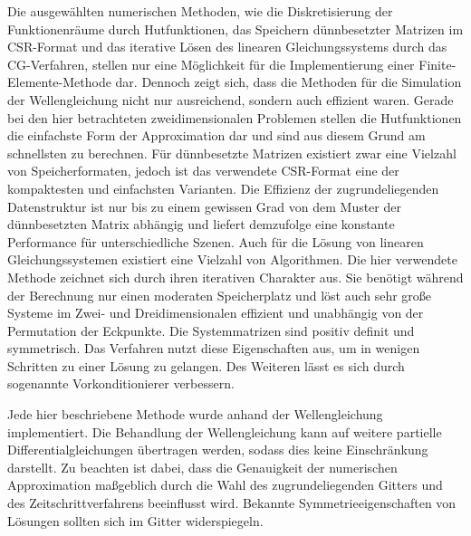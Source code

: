\documentclass{article}
\begin{document}
    Die ausgewählten numerischen Methoden, wie die Diskretisierung der Funktionenräume durch Hutfunktionen, das Speichern dünnbesetzter Matrizen im CSR-Format und das iterative Lösen des linearen Gleichungssystems durch das CG-Verfahren, stellen nur eine Möglichkeit für die Implementierung einer Finite-Elemente-Methode dar.
    Dennoch zeigt sich, dass die Methoden für die Simulation der Wellengleichung nicht nur ausreichend, sondern auch effizient waren.
    Gerade bei den hier betrachteten zweidimensionalen Problemen stellen die Hutfunktionen die einfachste Form der Approximation dar und sind aus diesem Grund am schnellsten zu berechnen.
    Für dünnbesetzte Matrizen existiert zwar eine Vielzahl von Speicherformaten, jedoch ist das verwendete CSR-Format eine der kompaktesten und einfachsten Varianten.
    Die Effizienz der zugrundeliegenden Datenstruktur ist nur bis zu einem gewissen Grad von dem Muster der dünnbesetzten Matrix abhängig und liefert demzufolge eine konstante Performance für unterschiedliche Szenen.
    Auch für die Lösung von linearen Gleichungssystemen existiert eine Vielzahl von Algorithmen.
    Die hier verwendete Methode zeichnet sich durch ihren iterativen Charakter aus.
    Sie benötigt während der Berechnung nur einen moderaten Speicherplatz und löst auch sehr große Systeme im Zwei- und Dreidimensionalen effizient und unabhängig von der Permutation der Eckpunkte.
    Die Systemmatrizen sind positiv definit und symmetrisch.
    Das Verfahren nutzt diese Eigenschaften aus, um in wenigen Schritten zu einer Lösung zu gelangen.
    Des Weiteren lässt es sich durch sogenannte Vorkonditionierer verbessern.

    Jede hier beschriebene Methode wurde anhand der Wellengleichung implementiert.
    Die Behandlung der Wellengleichung kann auf weitere partielle Differentialgleichungen übertragen werden, sodass dies keine Einschränkung darstellt.
    Zu beachten ist dabei, dass die Genauigkeit der numerischen Approximation maßgeblich durch die Wahl des zugrundeliegenden Gitters und des Zeitschrittverfahrens beeinflusst wird.
    Bekannte Symmetrieeigenschaften von Lösungen sollten sich im Gitter widerspiegeln.

\end{document}

